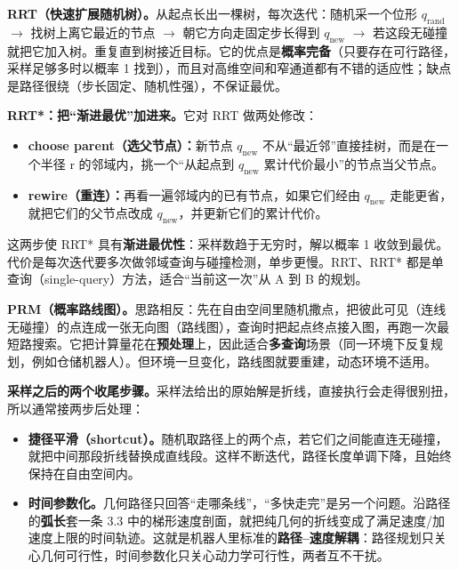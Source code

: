 \documentclass[11pt,a4paper]{ctexart}
\begin{document}
\textbf{RRT（快速扩展随机树）。}从起点长出一棵树，每次迭代：随机采一个位形 $q_{\mathrm{rand}}$ $\rightarrow$ 找树上离它最近的节点 $\rightarrow$ 朝它方向走固定步长得到 $q_{\mathrm{new}}$ $\rightarrow$ 若这段无碰撞就把它加入树。重复直到树接近目标。它的优点是\textbf{概率完备}（只要存在可行路径，采样足够多时以概率 1 找到），而且对高维空间和窄通道都有不错的适应性；缺点是路径很绕（步长固定、随机性强），不保证最优。\par

\textbf{RRT*：把“渐进最优”加进来。}它对 RRT 做两处修改：\par

\begin{itemize}[leftmargin=1.6em,itemsep=0.15em,topsep=0.25em]

\item \textbf{choose parent（选父节点）：}新节点 $q_{\mathrm{new}}$ 不从“最近邻”直接挂树，而是在一个半径 r 的邻域内，挑一个“从起点到 $q_{\mathrm{new}}$ 累计代价最小”的节点当父节点。

\item \textbf{rewire（重连）：}再看一遍邻域内的已有节点，如果它们经由 $q_{\mathrm{new}}$ 走能更省，就把它们的父节点改成 $q_{\mathrm{new}}$，并更新它们的累计代价。

\end{itemize}

这两步使 RRT* 具有\textbf{渐进最优性}：采样数趋于无穷时，解以概率 1 收敛到最优。代价是每次迭代要多次做邻域查询与碰撞检测，单步更慢。RRT、RRT* 都是单查询（single-query）方法，适合“当前这一次”从 A 到 B 的规划。\par

\textbf{PRM（概率路线图）。}思路相反：先在自由空间里随机撒点，把彼此可见（连线无碰撞）的点连成一张无向图（路线图），查询时把起点终点接入图，再跑一次最短路搜索。它把计算量花在\textbf{预处理}上，因此适合\textbf{多查询}场景（同一环境下反复规划，例如仓储机器人）。但环境一旦变化，路线图就要重建，动态环境不适用。\par

\textbf{采样之后的两个收尾步骤。}采样法给出的原始解是折线，直接执行会走得很别扭，所以通常接两步后处理：\par

\begin{itemize}[leftmargin=1.6em,itemsep=0.15em,topsep=0.25em]

\item \textbf{捷径平滑（shortcut）。}随机取路径上的两个点，若它们之间能直连无碰撞，就把中间那段折线替换成直线段。这样不断迭代，路径长度单调下降，且始终保持在自由空间内。

\item \textbf{时间参数化。}几何路径只回答“走哪条线”，“多快走完”是另一个问题。沿路径的\textbf{弧长}套一条 3.3 中的梯形速度剖面，就把纯几何的折线变成了满足速度/加速度上限的时间轨迹。这就是机器人里标准的\textbf{路径–速度解耦}：路径规划只关心几何可行性，时间参数化只关心动力学可行性，两者互不干扰。

\end{itemize}
\end{document}
